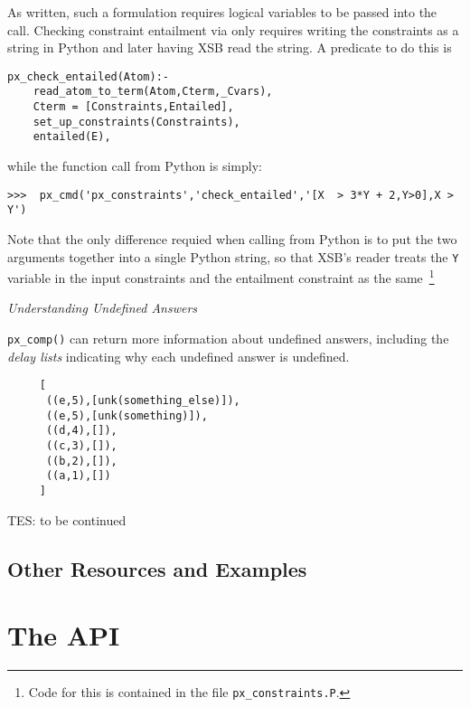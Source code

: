 \begin{example}
As written, such a formulation requires logical variables to be passed
into the call.  Checking constraint entailment via \px{} only requires
writing the constraints as a string in Python and later having XSB
read the string.  A predicate to do this is 

{\small
\begin{verbatim}
px_check_entailed(Atom):-
    read_atom_to_term(Atom,Cterm,_Cvars),
    Cterm = [Constraints,Entailed],
    set_up_constraints(Constraints),
    entailed(E),
\end{verbatim}
}

while the function call from Python is simply:

\begin{verbatim}
>>>  px_cmd('px_constraints','check_entailed','[X  > 3*Y + 2,Y>0],X > Y')
\end{verbatim}

Note that the only difference requied when calling from Python is to
put the two arguments together into a single Python string, so that
XSB's reader treats the {\tt Y} variable in the input constraints and
the entailment constraint as the same~\footnote{Code for this is
  contained in the file {\tt px\_constraints.P}.}
\end{example}

\begin{example} \rm {\it Understanding Undefined Answers} \label{ex:px-comp-undef}

{\tt px\_comp()} can return more information about undefined answers,
including the {\em delay lists} indicating why each undefined answer
is undefined.

\begin{verbatim}
     [
      ((e,5),[unk(something_else)]),
      ((e,5),[unk(something)]),
      ((d,4),[]),
      ((c,3),[]),
      ((b,2),[]),
      ((a,1),[]) 
     ]
\end{verbatim}

{\sc TES: to be continued}

  \end{example}



\subsection{Other \px{} Resources and Examples}


\section{The \px{} API}

